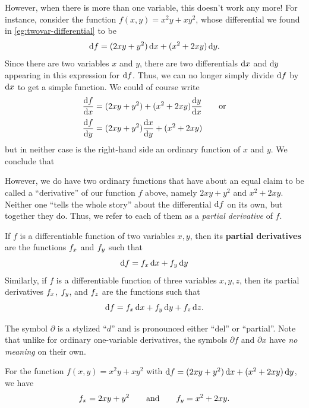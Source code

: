 However, when there is more than one variable, this doesn't work any more!
For instance, consider the function $f(x,y) = x^2y + xy^2$, whose differential we found in \cref{eg:twovar-differential} to be
\[ {\mathrm{d} f} = (2xy + y^2)\,{\mathrm{d} x} + (x^2+2xy)\,{\mathrm{d} y}.\]
Since there are two variables $x$ and $y$, there are two differentials ${\mathrm{d} x}$ and ${\mathrm{d} y}$ appearing in this expression for ${\mathrm{d} f}$.
Thus, we can no longer simply divide ${\mathrm{d} f}$ by ${\mathrm{d} x}$ to get a simple function.
We could of course write
\begin{align*}
  \frac{{\mathrm{d} f}}{{\mathrm{d} x}} &= (2xy + y^2) + (x^2+2xy)\frac{{\mathrm{d} y}}{{\mathrm{d} x}} \qquad\text{or}\\[2pt]
  \frac{{\mathrm{d} f}}{{\mathrm{d} y}} &= (2xy + y^2)\frac{{\mathrm{d} x}}{{\mathrm{d} y}} + (x^2+2xy)
\end{align*}
but in neither case is the right-hand side an ordinary function of $x$ and $y$.
We conclude that\\
\begin{center}
\end{center}
\vspace{5mm}
However, we do have two ordinary functions that have about an equal claim to be called a ``derivative'' of our function $f$ above, namely $2xy + y^2$ and $x^2+2xy$.
Neither one ``tells the whole story'' about the differential ${\mathrm{d} f}$ on its own, but together they do.
Thus, we refer to each of them as a \emph{partial derivative} of $f$.

\begin{defn}
  If $f$ is a differentiable function of two variables $x,y$, then its \textbf{partial derivatives} are the functions ${f}_{x}$ and ${f}_{y}$ such that
  \[ {\mathrm{d} f} = {f}_{x}\,{\mathrm{d} x} + {f}_{y}\,{\mathrm{d} y}\]
  Similarly, if $f$ is a differentiable function of three variables $x,y,z$, then its partial derivatives ${f}_{x}$, ${f}_{y}$, and ${f}_{z}$ are the functions such that
  \[ {\mathrm{d} f} = {f}_{x}\,{\mathrm{d} x} + {f}_{y}\,{\mathrm{d} y} + {f}_{z}\,{\mathrm{d} z}.\]
\end{defn}

The symbol $\partial$ is a stylized ``$d$'' and is pronounced either ``del'' or ``partial''.
Note that unlike for ordinary one-variable derivatives, the symbols $\partial f$ and $\partial x$ have \emph{no meaning} on their own.

\begin{eg}
  For the function $f(x,y) = x^2y + xy^2$ with ${\mathrm{d} f} = (2xy + y^2)\,{\mathrm{d} x} + (x^2+2xy)\,{\mathrm{d} y}$, we have
  \begin{align*}
    {f}_{x} = 2xy + y^2 \qquad\text{and}\qquad
    {f}_{y} = x^2+2xy.
  \end{align*}
\end{eg}

